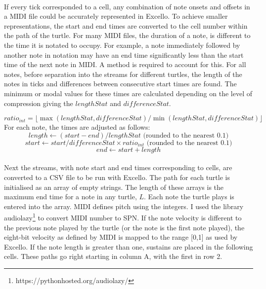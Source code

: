 \paragraph{} If every tick corresponded to a cell, any combination of note onsets and offsets in a MIDI file could be accurately represented in Excello. To achieve smaller representations, the start and end times are converted to the cell number within the path of the turtle. For many MIDI files, the duration of a note, is different to the time it is notated to occupy. For example, a note immediately followed by another note in notation may have an end time significantly less than the start time of the next note in MIDI. A method is required to account for this. For all notes, before separation into the streams for different turtles, the length of the notes in ticks and differences between consecutive start times are found. The minimum or modal values for these times are calculated depending on the level of compression giving the $lengthStat$ and $differenceStat$.

  $$ratio_{int} = \lfloor\max(lengthStat, differenceStat)/\min(lengthStat, differenceStat)\rfloor$$
For each note, the times are adjusted as follows:
  $$length \gets (start - end) / lengthStat \text{ (rounded to the nearest 0.1)}$$
  $$start \gets start / differenceStat \times ratio_{int} \text{ (rounded to the nearest 0.1)}$$
  $$end \gets start +length$$

\paragraph{} Next the streams, with note start and end times corresponding to cells, are converted to a CSV file to be run with Excello. The path for each turtle is initialised as an array of empty strings. The length of these arrays is the maximum end time for a note in any turtle, $L$.  Each note the turtle plays is entered into the array. MIDI defines pitch using the integers. I used the library audiolazy\footnote{https://pythonhosted.org/audiolazy/} to convert MIDI number to SPN. If the note velocity is different to the previous note played by the turtle (or the note is the first note played), the eight-bit velocity as defined by MIDI is mapped to the range [0,1] as used by Excello. If the note length is greater than one, sustains are placed in the following cells. These paths go right starting in column A, with the first in row 2.

